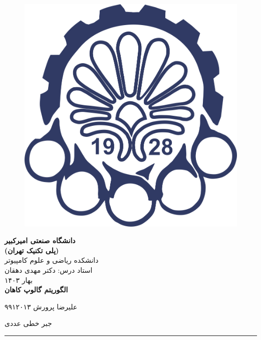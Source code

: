 
	\begin{figure}[t]
		\centering
		\includegraphics[width=0.6\linewidth]{assets/logo.png}
	\end{figure}

	\begin{center}

	\textbf{\huge{ دانشگاه صنعتی امیرکبیر }}
	\\
	
	\textbf{\large{ (پلی تکنیک تهران) }}
	\\[30pt]
	
	\Large{ دانشکده ریاضی و علوم کامپیوتر }
	\\
	{\large استاد درس: دکتر مهدی دهقان}
	\\
	بهار ۱۴۰۳ 
	\\[30pt]

	\textbf{\Huge   الگوریتم گالوپ کاهان } 
	\\[50pt]
	
	\end{center}
	  علیرضا پرورش 
	\hfill
	۹۹۱۲۰۱۳
	
	\hfill 
	جبر خطی عددی
	\rule[0pt]{\linewidth}{1pt}
	
	\pagebreak
	
	\tableofcontents
	
	
